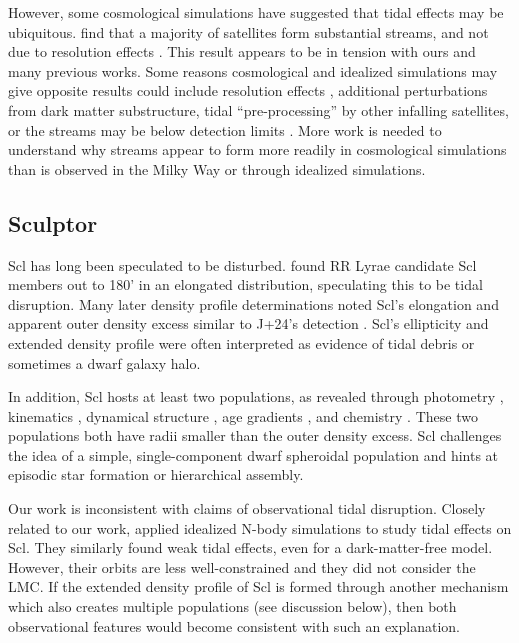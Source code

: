 However, some cosmological simulations have suggested that tidal effects
may be ubiquitous. \citep{riley+2024, shipp+2023} find that a majority
of satellites form substantial streams, and not due to resolution
effects \citep[see also][]{panithanpaisal+2021}. This result appears to
be in tension with ours and many previous works. Some reasons
cosmological and idealized simulations may give opposite results could
include resolution effects \citep[e.g.,][]{santos-santos+2025},
additional perturbations from dark matter substructure, tidal
``pre-processing'' by other infalling satellites, or the streams may be
below detection limits \citep[e.g.,][]{shipp+2023}. More work is needed
to understand why streams appear to form more readily in cosmological
simulations than is observed in the Milky Way or through idealized
simulations.

\subsection{Sculptor}\label{sculptor}

Scl has long been speculated to be disturbed. \citet{innanen+papp1979}
found RR Lyrae candidate Scl members \citep[from][]{vanagt1978} out to
180' in an elongated distribution, speculating this to be tidal
disruption. Many later density profile determinations noted Scl's
elongation and apparent outer density excess similar to J+24's detection
\citep[but see also
\citet{coleman+dacosta+bland-hawthorn2005}]{eskridge1988, IH1995, walcher+2003, westfall+2006}.
Scl's ellipticity and extended density profile were often interpreted as
evidence of tidal debris or sometimes a dwarf galaxy halo.

In addition, Scl hosts at least two populations, as revealed through
photometry \citep{tolstoy+2004}, kinematics
\citep{battaglia+2008, tolstoy+2023, arroyo-polonio+2024}, dynamical
structure \citep{breddels+helmi2014}, age gradients \citep{deboer+2011},
and chemistry \citep{kirby+2009}. These two populations both have radii
smaller than the outer density excess. Scl challenges the idea of a
simple, single-component dwarf spheroidal population and hints at
episodic star formation or hierarchical assembly.

Our work is inconsistent with claims of observational tidal disruption.
Closely related to our work, \citet{iorio+2019} applied idealized N-body
simulations to study tidal effects on Scl. They similarly found weak
tidal effects, even for a dark-matter-free model. However, their orbits
are less well-constrained and they did not consider the LMC. If the
extended density profile of Scl is formed through another mechanism
which also creates multiple populations (see discussion below), then
both observational features would become consistent with such an
explanation.


